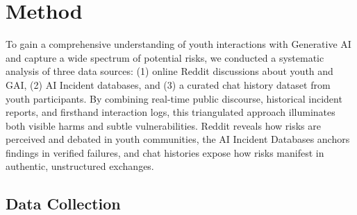 \vspace{-18pt}
\section{Method}
\vspace{-3pt}
To gain a comprehensive understanding of youth interactions with Generative AI and capture a wide spectrum of potential risks, we conducted a systematic analysis of three data sources: (1) online Reddit discussions about youth and GAI, (2) AI Incident databases, and (3) a curated chat history dataset from youth participants. By combining real-time public discourse, historical incident reports, and firsthand interaction logs, this triangulated approach illuminates both visible harms and subtle vulnerabilities. Reddit reveals how risks are perceived and debated in youth communities, the AI Incident Databases anchors findings in verified failures, and chat histories expose how risks manifest in authentic, unstructured exchanges. 
\vspace{-8pt}
\subsection{Data Collection}
